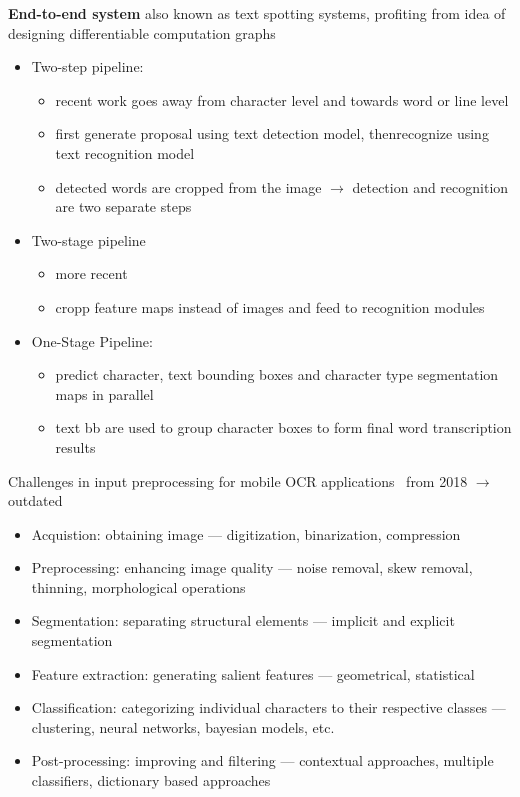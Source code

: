 \textbf{End-to-end system}
also known as text spotting systems, profiting from idea of designing differentiable computation graphs
\begin{itemize}
    \item Two-step pipeline:
        \begin{itemize}
            \item recent work goes away from character level and towards word or line level
            \item first generate proposal using text detection model, thenrecognize using
                text recognition model
            \item detected words are cropped from the image $\rightarrow$ detection and recognition
                are two separate steps
        \end{itemize}
    \item Two-stage pipeline
        \begin{itemize}
            \item more recent
            \item cropp feature maps instead of images and feed to recognition modules
        \end{itemize}
    \item One-Stage Pipeline:
        \begin{itemize}
            \item predict character, text bounding boxes and character type segmentation
                maps in parallel
            \item text bb are used to group character boxes to form final word transcription results
        \end{itemize}
\end{itemize}

Challenges in input preprocessing for mobile OCR applications~\cite{sourvanos_challenges_2018}
from 2018 $\rightarrow$ outdated
\begin{itemize}
    \item Acquistion: obtaining image --- digitization, binarization, compression
    \item Preprocessing: enhancing image quality --- noise removal, skew removal, thinning,
        morphological operations
    \item Segmentation: separating structural elements --- implicit and explicit segmentation
    \item Feature extraction: generating salient features --- geometrical, statistical
    \item Classification: categorizing individual characters to their respective classes --- clustering,
        neural networks, bayesian models, etc.
    \item Post-processing: improving and filtering --- contextual approaches, multiple classifiers, dictionary based approaches
\end{itemize}

